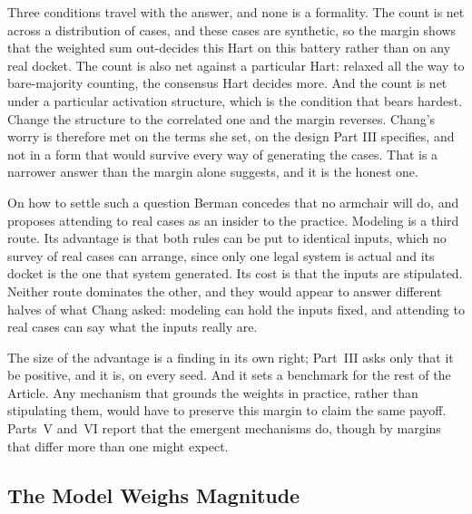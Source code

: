 Three conditions travel with the answer, and none is a formality. The count
is net across a distribution of cases, and these cases are synthetic, so
the margin shows that the weighted sum out-decides this Hart on
this battery rather than on any real docket. The count is also net against
a particular Hart: relaxed all the way to bare-majority counting, the
consensus Hart decides more. And the count is net under a particular
activation structure, which is the condition that bears hardest. Change the
structure to the correlated one and the margin reverses. Chang's worry is
therefore met on the terms she set, on the design Part III specifies, and
not in a form that would survive every way of generating the cases. That is
a narrower answer than the margin alone suggests, and it is the honest one.

On how to settle such a question Berman concedes that no armchair will do,
and proposes attending to real cases as an insider to the practice.
Modeling is a third route. Its advantage is that both rules can be put to
identical inputs, which no survey of real cases can arrange, since only one
legal system is actual and its docket is the one that system generated. Its
cost is that the inputs are stipulated. Neither route dominates the other,
and they would appear to answer different halves of what Chang asked: modeling
can hold the inputs fixed, and attending to real cases can say what the inputs
really are.

The size of the advantage is a finding in its own right; Part~III asks only
that it be positive, and it is, on every seed. And it sets a benchmark for
the rest of the Article. Any mechanism that grounds the weights in
practice, rather than stipulating them, would have to preserve this margin
to claim the same payoff. Parts~V and~VI report that the emergent mechanisms do, though by margins
that differ more than one might expect.

\subsection{The Model Weighs Magnitude}

